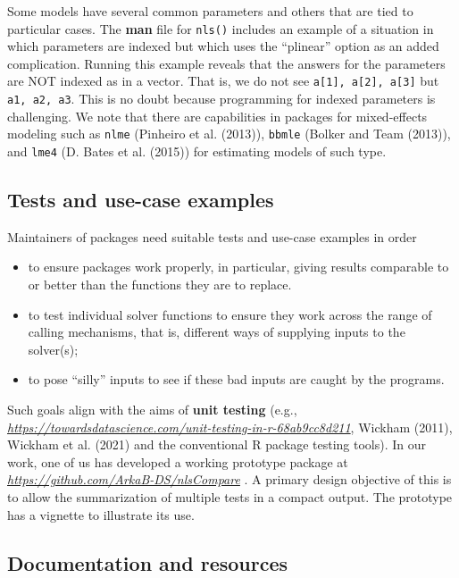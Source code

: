 Some models have several common parameters and
others that are tied to particular cases.
The \textbf{man} file for \texttt{nls()} includes an example of a situation in which
parameters are indexed but which uses the ``plinear'' option as an added complication.
Running this example reveals that the answers for the parameters are NOT indexed
as in a vector.
That is, we do not see \texttt{a{[}1{]},\ a{[}2{]},\ a{[}3{]}} but \texttt{a1,\ a2,\ a3}.
This is no doubt because programming for indexed parameters is challenging.
We note that there are capabilities in packages for mixed-effects modeling
such as \texttt{nlme} (Pinheiro et al. (2013)), \texttt{bbmle} (Bolker and Team (2013)), and \texttt{lme4} (D. Bates et al. (2015)) for
estimating models of such type.

\subsection{Tests and use-case examples}\label{tests-and-use-case-examples}

Maintainers of packages need suitable tests and use-case examples in order

\begin{itemize}
\tightlist
\item
  to ensure packages work properly, in particular, giving
  results comparable to or better than the functions they are to replace.
\item
  to test individual solver functions to ensure they work across the range of
  calling mechanisms, that is, different ways of supplying inputs to the solver(s);
\item
  to pose ``silly'' inputs to see if these bad inputs are caught by the programs.
\end{itemize}

Such goals align with the aims of \textbf{unit testing}
(e.g., \emph{\url{https://towardsdatascience.com/unit-testing-in-r-68ab9cc8d211}}, Wickham (2011), Wickham et al. (2021)
and the conventional R package testing tools).
In our work, one of us has developed a working prototype package at \emph{\url{https://github.com/ArkaB-DS/nlsCompare}} .
A primary design objective of this is to allow the summarization of multiple tests in
a compact output. The prototype has a vignette to illustrate its use.

\subsection{Documentation and resources}\label{documentation-and-resources}

